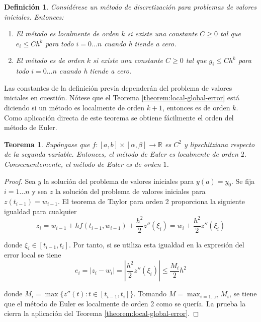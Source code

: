 \documentclass{article}
\theoremstyle{theorem-style}  %
\newtheorem{theorem}{Teorema}[section]  %
\theoremstyle{definition-style}
\newtheorem{definition}{Definición}[section]
\theoremstyle{example-style}
\begin{document}
	\begin{definition}
		Considérese un método de discretización para problemas de valores iniciales. Entonces:
		\begin{enumerate}
			\item El método es localmente de orden $k$ si existe una constante $C \ge 0$ tal que $e_i \le C h^k$ para todo $i = 0 \ldots n$ cuando h tiende a cero.
			\item El método es de orden $k$ si existe una constante $C \ge 0$ tal que $g_i \le C h^k$ para todo $i = 0 \ldots n$ cuando h tiende a cero.
		\end{enumerate}
	\end{definition}

	Las constantes de la definición previa dependerán del problema de valores iniciales en cuestión. Nótese que el Teorema \ref{theorem:local-global-error} está diciendo si un método es localmente de orden $k+1$, entonces es de orden $k$. Como aplicación directa de este teorema se obtiene fácilmente el orden del método de Euler.

	\begin{theorem} \label{theorem:euler:error}
		Supóngase que $f: [a,b] \times [\alpha, \beta] \rightarrow \mathbb{R}$ es $C^2$ y lipschitziana respecto de la segunda variable. Entonces, el método de Euler es localmente de orden $2$. Consecuentemente, el método de Euler es de orden $1$.
	\end{theorem}

	\begin{proof}
		Sea $y$ la solución del problema de valores iniciales para $y(a) = y_0$. Se fija $i = 1 \ldots n$ y sea $z$ la solución del problema de valores iniciales para $z(t_{i-1}) = w_{i-1}$. El teorema de Taylor para orden 2 proporciona la siguiente igualdad para cualquier
		\begin{equation}
			z_i= w_{i-1} + h f(t_{i-1}, w_{i-1}) + \frac{h^2}{2} z''(\xi_i) = w_i + \frac{h^2}{2} z''(\xi_i)
		\end{equation}

		donde $\xi_i \in [t_{i-1}, t_i]$. Por tanto, si se utiliza esta igualdad en la expresión del error local se tiene
		\begin{equation}
			e_i = |z_i - w_i| = \left|\frac{h^2}{2} z''(\xi_i)\right| \le \frac{M_i}{2} h^2
		\end{equation}

		donde $M_i = \max\{z''(t) : t \in [t_{i-1}, t_i]\}$. Tomando $M = \max_{i = 1 \ldots n} M_i$, se tiene que el método de Euler es localmente de orden 2 como se quería. La prueba la cierra la aplicación del Teorema \ref{theorem:local-global-error}.
	\end{proof}
\end{document}
